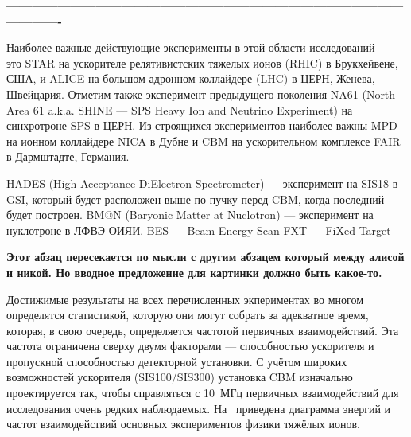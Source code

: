 \textbf{----------------------------------------------------------------------------------------------------------}



Наиболее важные действующие эксперименты в этой области исследований --- это STAR на ускорителе релятивистских тяжелых ионов (RHIC) в Брукхейвене, США, и ALICE на большом адронном коллайдере (LHC) в ЦЕРН, Женева, Швейцария. Отметим также эксперимент предыдущего поколения NA61 (North Area 61 a.k.a. SHINE --- SPS Heavy Ion and Neutrino Experiment) на синхротроне SPS в ЦЕРН. Из строящихся экспериментов наиболее важны MPD на ионном коллайдере NICA в Дубне и CBM на ускорительном комплексе FAIR в Дармштадте, Германия.

HADES (High Acceptance DiElectron Spectrometer) --- эксперимент на SIS18 в GSI, который будет расположен выше по пучку перед CBM, когда последний будет построен.
BM$@$N (Baryonic Matter at Nuclotron) --- эксперимент на нуклотроне в ЛФВЭ ОИЯИ.
BES --- Beam Energy Scan
FXT --- FiXed Target

\todo \textbf{Этот абзац пересекается по мысли с другим абзацем который между алисой и никой. Но вводное предложение для картинки должно быть какое-то.}

Достижимые результаты на всех перечисленных экпериментах во многом определятся статистикой, которую они могут собрать за адекватное время, которая, в свою очередь, определяется частотой первичных взаимодействий. 
Эта частота ограничена сверху двумя факторами --- способностью ускорителя и пропускной способностью детекторной установки.
С учётом широких возможностей ускорителя (SIS100/SIS300) установка CBM изначально проектируется так, чтобы справляться с 10~МГц первичных взаимодействий для исследования очень редких наблюдаемых.
На~ приведена диаграмма энергий и частот взаимодействий основных экспериментов физики тяжёлых ионов.

